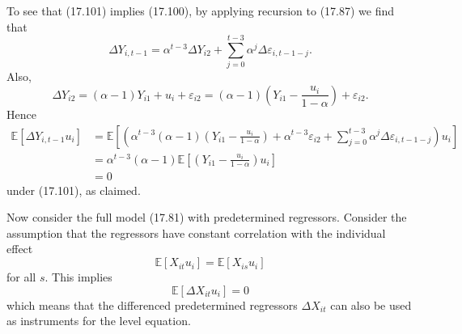 \documentclass[10pt]{article}
\begin{document}
To see that (17.101) implies (17.100), by applying recursion to (17.87) we find that
$$
\Delta Y_{i, t-1}=\alpha^{t-3} \Delta Y_{i 2}+\sum_{j=0}^{t-3} \alpha^{j} \Delta \varepsilon_{i, t-1-j} .
$$
Also,
$$
\Delta Y_{i 2}=(\alpha-1) Y_{i 1}+u_{i}+\varepsilon_{i 2}=(\alpha-1)\left(Y_{i 1}-\frac{u_{i}}{1-\alpha}\right)+\varepsilon_{i 2} .
$$
Hence
$$
\begin{aligned}
\mathbb{E}\left[\Delta Y_{i, t-1} u_{i}\right] &=\mathbb{E}\left[\left(\alpha^{t-3}(\alpha-1)\left(Y_{i 1}-\frac{u_{i}}{1-\alpha}\right)+\alpha^{t-3} \varepsilon_{i 2}+\sum_{j=0}^{t-3} \alpha^{j} \Delta \varepsilon_{i, t-1-j}\right) u_{i}\right] \\
&=\alpha^{t-3}(\alpha-1) \mathbb{E}\left[\left(Y_{i 1}-\frac{u_{i}}{1-\alpha}\right) u_{i}\right] \\
&=0
\end{aligned}
$$
under (17.101), as claimed.

Now consider the full model (17.81) with predetermined regressors. Consider the assumption that the regressors have constant correlation with the individual effect
$$
\mathbb{E}\left[X_{i t} u_{i}\right]=\mathbb{E}\left[X_{i s} u_{i}\right]
$$
for all $s$. This implies
$$
\mathbb{E}\left[\Delta X_{i t} u_{i}\right]=0
$$
which means that the differenced predetermined regressors $\Delta X_{i t}$ can also be used as instruments for the level equation.
\end{document}
